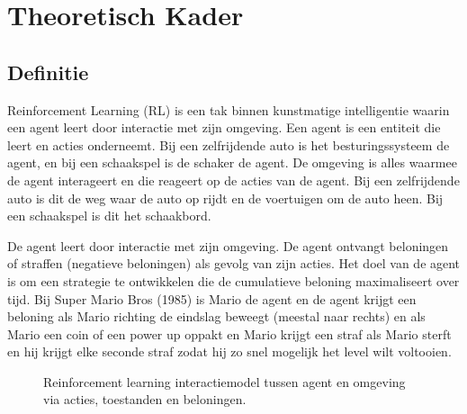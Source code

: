 \documentclass[a4paper,12pt]{article}
\begin{document}
\newpage
\section{Theoretisch Kader}
\subsection{Definitie}
Reinforcement Learning (RL) is een tak binnen kunstmatige intelligentie waarin
een agent leert door interactie met zijn omgeving. Een agent is een entiteit
die leert en acties onderneemt. Bij een zelfrijdende auto is het
besturingssysteem de agent, en bij een schaakspel is de schaker de agent. De
omgeving is alles waarmee de agent interageert en die reageert op de acties van
de agent. Bij een zelfrijdende auto is dit de weg waar de auto op rijdt en de
voertuigen om de auto heen. Bij een schaakspel is dit het schaakbord.

De agent leert door interactie met zijn omgeving. De agent ontvangt beloningen
of straffen (negatieve beloningen) als gevolg van zijn acties. Het doel van de
agent is om een strategie te ontwikkelen die de cumulatieve beloning
maximaliseert over tijd. Bij Super Mario Bros (1985) is Mario de agent en de
agent krijgt een beloning als Mario richting de eindslag beweegt (meestal naar
rechts) en als Mario een coin of een power up oppakt en Mario krijgt een straf
als Mario sterft en hij krijgt elke seconde straf zodat hij zo snel mogelijk
het level wilt voltooien.

\begin{figure}[h]
    \caption{Reinforcement learning interactiemodel tussen agent en omgeving via acties, toestanden en beloningen.}
\end{figure}
\end{document}
